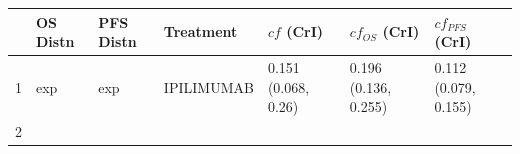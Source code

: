 \documentclass[
]{article}
\begin{document}
\begin{longtable}[]{@{}lllllll@{}}
\toprule
\begin{minipage}[b]{0.03\columnwidth}\raggedright
\strut
\end{minipage} & \begin{minipage}[b]{0.09\columnwidth}\raggedright
OS Distn\strut
\end{minipage} & \begin{minipage}[b]{0.09\columnwidth}\raggedright
PFS Distn\strut
\end{minipage} & \begin{minipage}[b]{0.15\columnwidth}\raggedright
Treatment\strut
\end{minipage} & \begin{minipage}[b]{0.15\columnwidth}\raggedright
\(cf\) (CrI)\strut
\end{minipage} & \begin{minipage}[b]{0.15\columnwidth}\raggedright
\(cf_{OS}\) (CrI)\strut
\end{minipage} & \begin{minipage}[b]{0.15\columnwidth}\raggedright
\(cf_{PFS}\) (CrI)\strut
\end{minipage}\tabularnewline
\midrule
\endhead
\begin{minipage}[t]{0.03\columnwidth}\raggedright
1\strut
\end{minipage} & \begin{minipage}[t]{0.09\columnwidth}\raggedright
exp\strut
\end{minipage} & \begin{minipage}[t]{0.09\columnwidth}\raggedright
exp\strut
\end{minipage} & \begin{minipage}[t]{0.15\columnwidth}\raggedright
IPILIMUMAB\strut
\end{minipage} & \begin{minipage}[t]{0.15\columnwidth}\raggedright
0.151 (0.068, 0.26)\strut
\end{minipage} & \begin{minipage}[t]{0.15\columnwidth}\raggedright
0.196 (0.136, 0.255)\strut
\end{minipage} & \begin{minipage}[t]{0.15\columnwidth}\raggedright
0.112 (0.079, 0.155)\strut
\end{minipage}\tabularnewline
\begin{minipage}[t]{0.03\columnwidth}\raggedright
2\strut
\end{minipage} & \begin{minipage}[t]{0.09\columnwidth}\raggedright

\end{minipage}
\end{longtable}
\end{document}
